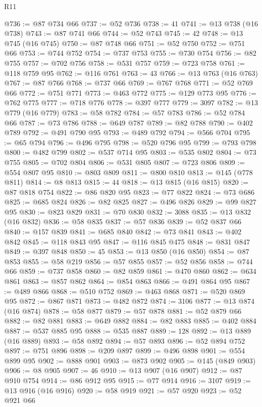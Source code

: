 \begin{lexlean}{R11}
\begin{coremodule}
@736 := @87 @734 @66
@737 := @52 @736
@738 := 41
@741 := @13 @738 (@16 @738)
@743 := @87 @741 @66
@744 := @52 @743
@745 := 42
@748 := @13 @745 (@16 @745)
@750 := @87 @748 @66
@751 := @52 @750
@752 := @751 @66
@753 := @744 @752
@754 := @737 @753
@755 := @730 @754
@756 := @82 @755
@757 := @702 @756
@758 := @531 @757
@759 := @723 @758
@761 := @118 @759 @95
@762 := @116 @761
@763 := 43
@766 := @13 @763 (@16 @763)
@767 := @87 @766
@768 := @737 @66
@769 := @767 @768
@771 := @52 @769 @66
@772 := @751 @771
@773 := @463 @772
@775 := @129 @773 @95
@776 := @762 @775
@777 := @718 @776
@778 := @397 @777
@779 := 3097
@782 := @13 @779 (@16 @779)
@783 := @58 @782
@784 := @57 @783
@786 := @52 @784 @66
@787 := @73 @786
@788 := @649 @787
@789 := @82 @788
@790 := @402 @789
@792 := @491 @790 @95
@793 := @489 @792
@794 := @566 @704
@795 := @65 @794
@796 := @496 @795
@798 := @520 @796 @95
@799 := @793 @798
@800 := @482 @799
@802 := @537 @714 @95
@803 := @535 @802
@804 := @73 @755
@805 := @702 @804
@806 := @531 @805
@807 := @723 @806
@809 := @554 @807 @95
@810 := @803 @809
@811 := @800 @810
@813 := @145 (@778 @811)
@814 := @8 @813
@815 := 44
@818 := @13 @815 (@16 @815)
@820 := @87 @818 @754
@822 := @86 @820 @95
@823 := @77 @822
@824 := @73 @686
@825 := @685 @824
@826 := @82 @825
@827 := @496 @826
@829 := @99 @827 @95
@830 := @823 @829
@831 := @70 @830
@832 := 3088
@835 := @13 @832 (@16 @832)
@836 := @58 @835
@837 := @57 @836
@839 := @52 @837 @66
@840 := @157 @839
@841 := @685 @840
@842 := @73 @841
@843 := @402 @842
@845 := @118 @843 @95
@847 := @116 @845 @475
@848 := @831 @847
@849 := @397 @848
@850 := 45
@853 := @13 @850 (@16 @850)
@854 := @87 @853
@855 := @58 @219
@856 := @57 @855
@857 := @52 @856
@858 := @744 @66
@859 := @737 @858
@860 := @82 @859
@861 := @470 @860
@862 := @634 @861
@863 := @857 @862
@864 := @854 @863
@866 := @491 @864 @95
@867 := @489 @866
@868 := @510 @752
@869 := @463 @868
@871 := @520 @869 @95
@872 := @867 @871
@873 := @482 @872
@874 := 3106
@877 := @13 @874 (@16 @874)
@878 := @58 @877
@879 := @57 @878
@881 := @52 @879 @66
@882 := @82 @881
@883 := @649 @882
@884 := @82 @883
@885 := @402 @884
@887 := @537 @885 @95
@888 := @535 @887
@889 := 128
@892 := @13 @889 (@16 @889)
@893 := @58 @892
@894 := @57 @893
@896 := @52 @894 @752
@897 := @751 @896
@898 := @209 @897
@899 := @496 @898
@901 := @554 @899 @95
@902 := @888 @901
@903 := @873 @902
@905 := @145 (@849 @903)
@906 := @8 @905
@907 := 46
@910 := @13 @907 (@16 @907)
@912 := @87 @910 @754
@914 := @86 @912 @95
@915 := @77 @914
@916 := 3107
@919 := @13 @916 (@16 @916)
@920 := @58 @919
@921 := @57 @920
@923 := @52 @921 @66

\end{coremodule}
\end{lexlean}
